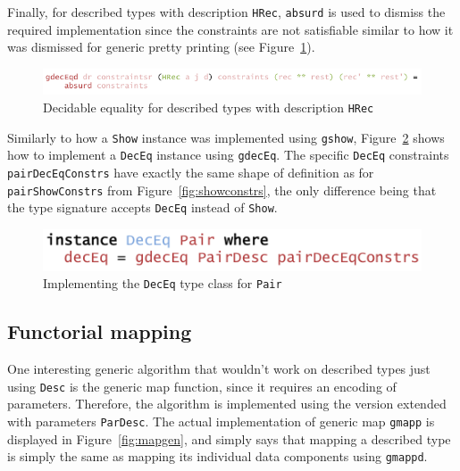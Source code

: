 \documentclass{ituthesis}
\newcommand{\ttconstructor}[1]{\textcolor{constructor-color}{\texttt{#1}}}
\newcommand{\tttype}[1]{\textcolor{type-color}{\texttt{#1}}}
\newcommand{\ttdec}[1]{\textcolor{declared-var-color}{\texttt{#1}}}
\theoremstyle{break}
\begin{document}
Finally, for described types with description \ttconstructor{HRec}, \ttdec{absurd} is used to dismiss the required implementation since the constraints are not satisfiable similar to
how it was dismissed for generic pretty printing (see Figure~\ref{fig:deceqgendesc4}).

\begin{figure}[ht]
\begin{center}
    \includegraphics[scale=0.5]{Figures/GenericDecEqDesc4.png}
\end{center}
\caption{Decidable equality for described types with description \ttconstructor{HRec}}
\label{fig:deceqgendesc4}
\end{figure}

Similarly to how a \tttype{Show} instance was implemented using \ttdec{gshow}, Figure~\ref{fig:deceqinst} shows how to implement a \tttype{DecEq} instance using
\ttdec{gdecEq}. The specific \tttype{DecEq} constraints \ttdec{pairDecEqConstrs} have exactly the same shape of definition as for \ttdec{pairShowConstrs} from Figure~\ref{fig:showconstrs}, the only difference
being that the type signature accepts \tttype{DecEq} instead of \tttype{Show}.

\begin{figure}[ht]
\begin{center}
    \includegraphics[scale=0.5]{Figures/GenericDecEqInstance.png}
\end{center}
\caption{Implementing the \tttype{DecEq} type class for \ttdec{Pair}}
\label{fig:deceqinst}
\end{figure}

\subsection{Functorial mapping}
\label{sub:Functorial mapping}
One interesting generic algorithm that wouldn't work on described types just using \tttype{Desc} is the generic map function, since it requires
an encoding of parameters.
Therefore, the algorithm is implemented using the version extended with parameters \tttype{ParDesc}.
The actual implementation of generic map \ttdec{gmapp} is displayed in Figure~\ref{fig:mapgen}, and simply says that
mapping a described type is simply the same as mapping its individual data components using \ttdec{gmappd}.
\end{document}
